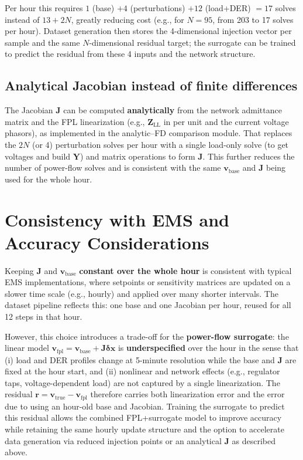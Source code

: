 \documentclass[11pt]{article}
\begin{document}
Per hour this requires $1$ (base) $+ 4$ (perturbations) $+ 12$ (load+DER) $= 17$ solves instead of $13 + 2N$, greatly reducing cost (e.g., for $N=95$, from 203 to 17 solves per hour). Dataset generation then stores the 4-dimensional injection vector per sample and the same $N$-dimensional residual target; the surrogate can be trained to predict the residual from these 4 inputs and the network structure.

\subsection{Analytical Jacobian instead of finite differences}

The Jacobian $\mathbf{J}$ can be computed \textbf{analytically} from the network admittance matrix and the FPL linearization (e.g., $\mathbf{Z}_{\mathrm{LL}}$ in per unit and the current voltage phasors), as implemented in the analytic--FD comparison module. That replaces the $2N$ (or 4) perturbation solves per hour with a single load-only solve (to get voltages and build $\mathbf{Y}$) and matrix operations to form $\mathbf{J}$. This further reduces the number of power-flow solves and is consistent with the same $\mathbf{v}_{\mathrm{base}}$ and $\mathbf{J}$ being used for the whole hour.

\section{Consistency with EMS and Accuracy Considerations}

Keeping $\mathbf{J}$ and $\mathbf{v}_{\mathrm{base}}$ \textbf{constant over the whole hour} is consistent with typical EMS implementations, where setpoints or sensitivity matrices are updated on a slower time scale (e.g., hourly) and applied over many shorter intervals. The dataset pipeline reflects this: one base and one Jacobian per hour, reused for all 12 steps in that hour.

However, this choice introduces a trade-off for the \textbf{power-flow surrogate}: the linear model $\mathbf{v}_{\mathrm{fpl}} = \mathbf{v}_{\mathrm{base}} + \mathbf{J}\boldsymbol{\delta}\mathbf{x}$ is \textbf{underspecified} over the hour in the sense that (i) load and DER profiles change at 5-minute resolution while the base and $\mathbf{J}$ are fixed at the hour start, and (ii) nonlinear and network effects (e.g., regulator taps, voltage-dependent load) are not captured by a single linearization. The residual $\mathbf{r} = \mathbf{v}_{\mathrm{true}} - \mathbf{v}_{\mathrm{fpl}}$ therefore carries both linearization error and the error due to using an hour-old base and Jacobian. Training the surrogate to predict this residual allows the combined FPL+surrogate model to improve accuracy while retaining the same hourly update structure and the option to accelerate data generation via reduced injection points or an analytical $\mathbf{J}$ as described above.
\end{document}
